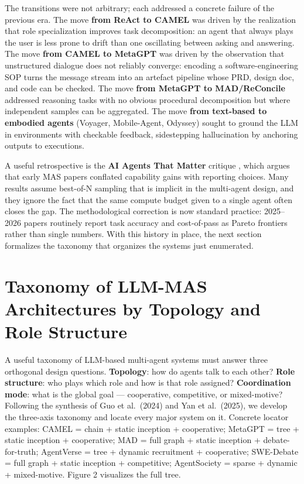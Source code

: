 \documentclass{article}
\begin{document}
The transitions were not arbitrary; each addressed a concrete failure of the previous era. The move \textbf{from ReAct to CAMEL} was driven by the realization that role specialization improves task decomposition: an agent that always plays the user is less prone to drift than one oscillating between asking and answering. The move \textbf{from CAMEL to MetaGPT} was driven by the observation that unstructured dialogue does not reliably converge: encoding a software-engineering SOP turns the message stream into an artefact pipeline whose PRD, design doc, and code can be checked. The move \textbf{from MetaGPT to MAD/ReConcile} addressed reasoning tasks with no obvious procedural decomposition but where independent samples can be aggregated. The move \textbf{from text-based to embodied agents} (Voyager, Mobile-Agent, Odyssey) sought to ground the LLM in environments with checkable feedback, sidestepping hallucination by anchoring outputs to executions.

A useful retrospective is the \textbf{AI Agents That Matter} critique \citep{kapoor2024aiagentsthatmatter}, which argues that early MAS papers conflated capability gains with reporting choices. Many results assume best-of-N sampling that is implicit in the multi-agent design, and they ignore the fact that the same compute budget given to a single agent often closes the gap. The methodological correction is now standard practice: 2025--2026 papers routinely report task accuracy and cost-of-pass as Pareto frontiers rather than single numbers. With this history in place, the next section formalizes the taxonomy that organizes the systems just enumerated.

\section{Taxonomy of LLM-MAS Architectures by Topology and Role Structure}\label{taxonomy-of-llm-mas-architectures-by-topology-and-role-structure}

A useful taxonomy of LLM-based multi-agent systems must answer three orthogonal design questions. \textbf{Topology}: how do agents talk to each other? \textbf{Role structure}: who plays which role and how is that role assigned? \textbf{Coordination mode}: what is the global goal --- cooperative, competitive, or mixed-motive? Following the synthesis of Guo et al.~(2024) and Yan et al.~(2025), we develop the three-axis taxonomy and locate every major system on it. Concrete locator examples: CAMEL = chain + static inception + cooperative; MetaGPT = tree + static inception + cooperative; MAD = full graph + static inception + debate-for-truth; AgentVerse = tree + dynamic recruitment + cooperative; SWE-Debate = full graph + static inception + competitive; AgentSociety = sparse + dynamic + mixed-motive. Figure 2 visualizes the full tree.
\end{document}
